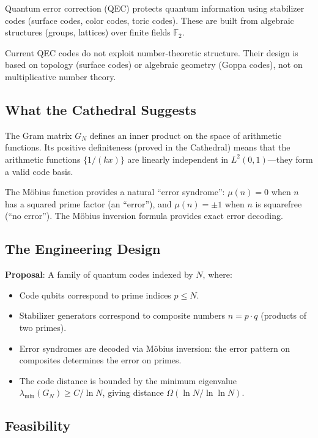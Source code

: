 \documentclass[11pt,a4paper]{article}
\begin{document}
Quantum error correction (QEC) protects quantum information using
stabilizer codes (surface codes, color codes, toric codes). These
are built from algebraic structures (groups, lattices) over finite
fields $\mathbb{F}_2$.

Current QEC codes do not exploit number-theoretic structure. Their
design is based on topology (surface codes) or algebraic geometry
(Goppa codes), not on multiplicative number theory.

\subsection{What the Cathedral Suggests}

The Gram matrix $G_N$ defines an inner product on the space of
arithmetic functions. Its positive definiteness (proved in the
Cathedral) means that the arithmetic functions $\{1/(kx)\}$ are
linearly independent in $L^2(0,1)$---they form a valid code
basis.

The M\"obius function provides a natural ``error syndrome'':
$\mu(n) = 0$ when $n$ has a squared prime factor (an ``error''),
and $\mu(n) = \pm 1$ when $n$ is squarefree (``no error''). The
M\"obius inversion formula provides exact error decoding.

\subsection{The Engineering Design}

\textbf{Proposal}: A family of quantum codes indexed by $N$, where:
\begin{itemize}
  \item Code qubits correspond to prime indices $p \leq N$.
  \item Stabilizer generators correspond to composite numbers
    $n = p \cdot q$ (products of two primes).
  \item Error syndromes are decoded via M\"obius inversion:
    the error pattern on composites determines the error on primes.
  \item The code distance is bounded by the minimum eigenvalue
    $\lambda_{\min}(G_N) \geq C / \ln N$, giving distance
    $\Omega(\ln N / \ln \ln N)$.
\end{itemize}

\subsection{Feasibility}
\end{document}
